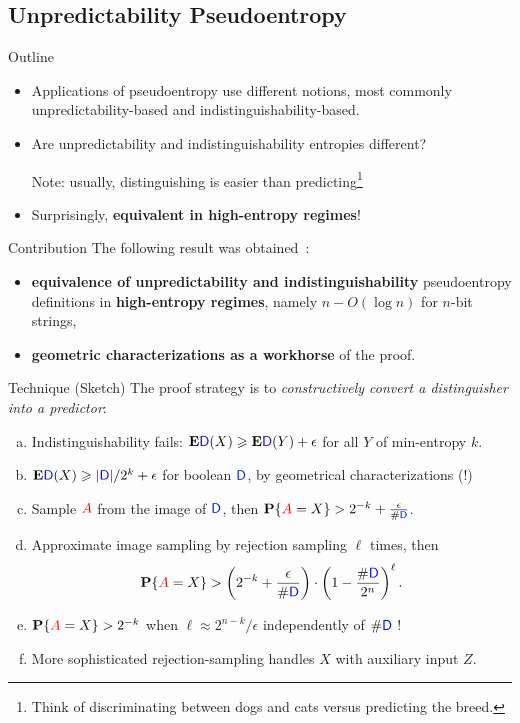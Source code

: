 \documentclass[10pt]{beamer}					%
\begin{document}
\subsection{Unpredictability Pseudoentropy }

\begin{frame}{Outline}
\begin{itemize}
\item[\emoji{open-book}] Applications of pseudoentropy use different notions, most commonly unpredictability-based and indistinguishability-based.
\item[\emoji{question}] Are unpredictability and indistinguishability entropies different? 

Note: usually, distinguishing is easier than predicting\footnote{Think of discriminating between dogs and cats versus predicting the breed.}
\item[\emoji{raised-hand}] Surprisingly, \textbf{equivalent in high-entropy regimes}!
\end{itemize}
\end{frame}

\begin{frame}{Contribution}
The following result was obtained~\cite{DBLP:conf/icalp/SkorskiGP15}:
\begin{itemize}
    \item[\emoji{key}] \textbf{equivalence of unpredictability and indistinguishability} pseudoentropy definitions in \textbf{high-entropy regimes}, namely $n-O(\log n)$ for $n$-bit strings,
    \item[\emoji{key}] \textbf{geometric characterizations as a workhorse} of the proof.
\end{itemize}
\end{frame}

\begin{frame}{Technique (Sketch)}
The proof strategy is to \emph{constructively convert a distinguisher into a predictor}:
\newcommand{\D}{\textcolor{blue}{\mathsf{D}}}
\begin{enumerate}[(a)]
    \item Indistinguishability fails: $\mathbf{E}\D(X)\geqslant \mathbf{E}\D(Y)+\epsilon$ for all $Y$ of min-entropy $k$.
    \item $\mathbf{E}\D(X)\geqslant |\D|/2^{k}+\epsilon$ for boolean $\D$, by geometrical characterizations (!)
    \item Sample $\textcolor{red}{A}$ from the image of $\D$, then $\mathbf{P}\{\textcolor{red}{A} = X\} > 2^{-k}+\frac{\epsilon}{\#\D}$.
    \item Approximate image sampling by rejection sampling $\ell$ times, then
    $$\mathbf{P}\{\textcolor{red}{A} = X\} > \left( 2^{-k}+\frac{\epsilon}{\#\D} \right)\cdot \left(1-\frac{\# \D}{2^n}\right)^{\ell}.$$
    \item $\mathbf{P}\{\textcolor{red}{A} = X\} > 2^{-k}$  when $\ell \approx 2^{n-k}/\epsilon$ independently of $\# \D$ !
    \item[\emoji{warning}] More sophisticated rejection-sampling handles $X$ with auxiliary input $Z$.
\end{enumerate}
\end{frame}
\end{document}
